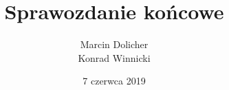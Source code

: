 \documentclass[a4paper,titlepage,11pt,twosides,floatssmall]{mwrep}
\begin{document}
\frenchspacing
\pagestyle{uheadings}

\title{\bf Sprawozdanie końcowe \vskip 0.1cm}
\author{Marcin Dolicher \\ \indent Konrad Winnicki}
\date{7 czerwca 2019}

\makeatletter
\renewcommand{\maketitle}{\begin{titlepage}
\begin{center}
{\LARGE {\bf Politechnika Warszawska}}\\
\vspace{0.4cm}
{\LARGE {\bf Wydział Elektroniki i Technik Informacyjnych}}\\
\vspace{0.2cm}
{\LARGE {\bf Instytut Automatyki i Informatyki Stosowanej}}\\
\end{center}
\vspace{5cm}
\begin{center}
{\bf \LARGE Zaawansowane programowanie w C++ \vskip 0.1cm}
\end{center}
\vspace{1cm}
\begin{center}
{\bf \LARGE \@title}
\end{center}
\vspace{9cm}
\begin{multicols}{2}
	\bf \large Autorzy:\\ \Large \indent	\@author \par
	\vfill\null
	\columnbreak
	\bf \large Prowadzący projekt:\\ \Large \indent	mgr inż. Konrad Grochowski \par
\end{multicols}
\vspace*{\stretch{6}}
\begin{center}
\bf{\large{Warszawa, \@date\vskip 0.1cm}}
\end{center}
\end{titlepage}
}
\makeatother
\end{document}
